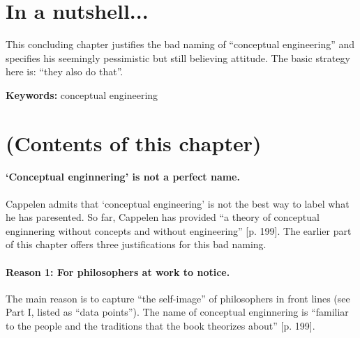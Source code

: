 \documentclass[
10pt, %
a4paper, %
twocolumn, %
landscape %
]{article}
\begin{document}
\pagestyle{myheadings} %
\markright{\doctitle} %


\thispagestyle{plain} %

\printtitle %


\section*{In a nutshell... }
This concluding chapter justifies the bad naming of ``conceptual engineering'' and specifies his seemingly pessimistic but still believing attitude.
The basic strategy here is: ``they also do that''. 

\noindent \textbf{Keywords:} conceptual engineering

\section*{(Contents of this chapter)}
\paragraph{`Conceptual enginnering' is not a perfect name.}
Cappelen admits that `conceptual engineering' is not the best way to label what he has paresented.
So far, Cappelen has provided ``a theory of conceptual enginnering without concepts and without engineering''
[p. 199].
The earlier part of this chapter offers three justifications for this bad naming.

\paragraph{Reason 1: For philosophers at work to notice. }
The main reason is to capture ``the self-image'' of philosophers in front lines (see Part I, listed as ``data points'').
The name of conceptual enginnering is ``familiar to the people and the traditions that the book theorizes about'' [p. 199].
\end{document}
